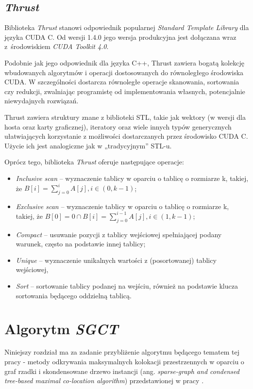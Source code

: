 \documentclass[12pt]{article}
\begin{document}
\subsection{\textit{Thrust}}

Biblioteka \textit{Thrust} stanowi odpowiednik popularnej \textit{Standard Template Library} dla języka CUDA C. Od wersji 1.4.0 jego wersja produkcyjna jest dołączana wraz z~środowiskiem \textit{CUDA Toolkit 4.0}.

Podobnie jak jego odpowiednik dla języka C++, Thrust zawiera bogatą kolekcję wbudowanych algorytmów i operacji dostosowanych do równoległego środowiska CUDA. W szczególności dostarcza równoległe operacje skanowania, sortowania czy redukcji, zwalniając programistę od implementowania własnych, potencjalnie niewydajnych rozwiązań.

Thrust zawiera struktury znane z biblioteki STL, takie jak wektory (w wersji dla hosta oraz karty graficznej), iteratory oraz wiele innych typów generycznych ułatwiających korzystanie z możliwości dostarczanych przez środowisko CUDA C. Użycie ich jest analogiczne jak w „tradycyjnym” STL-u.

Oprócz tego, biblioteka \textit{Thrust} oferuje następujące operacje:

\begin{itemize}
\item \textit{Inclusive scan} – wyznaczenie tablicy w oparciu o tablicę o rozmiarze k, takiej, że $ B[i] = \sum\limits_{j=0}^{i} A[j], i \in (0, k-1) $;
\item \textit{Exclusive scan} – wyznaczenie tablicy w oparciu o tablicę o rozmiarze k, takiej, że $ B[0] = 0 \cap B[i] = \sum\limits_{j=0}^{i-1} A[j], i \in (1,k-1) $;
\item \textit{Compact} – usuwanie pozycji z tablicy wejściowej spełniającej podany warunek, często na podstawie innej tablicy;
\item \textit{Unique} – wyznaczenie unikalnych wartości z (posortowanej) tablicy wejściowej,
\item \textit{Sort} – sortowanie tablicy podanej na wejściu, również na podstawie klucza sortowania będącego oddzielną tablicą.
\end{itemize}
\newpage

\section{Algorytm \textit{SGCT}}
\label{sec:china}

Niniejszy rozdział ma za zadanie przybliżenie algorytmu będącego tematem tej pracy - metody odkrywania maksymalnych kolokacji przestrzennych w oparciu o graf rzadki i skondensowane drzewo instancji (ang. \textit{sparse-graph and condensed tree-based maximal co-location algorithm}) przedstawionej w pracy \cite{chinczyki}. 
\end{document}
